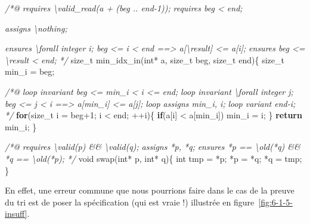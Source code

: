 \documentclass[12pt,francais,]{scrbook}
\newenvironment{Shaded}{}{}
\newcommand{\KeywordTok}[1]{\textcolor[rgb]{0.00,0.44,0.13}{\textbf{{#1}}}}
\newcommand{\DataTypeTok}[1]{\textcolor[rgb]{0.56,0.13,0.00}{{#1}}}
\newcommand{\DecValTok}[1]{\textcolor[rgb]{0.25,0.63,0.44}{{#1}}}
\newcommand{\CommentTok}[1]{\textcolor[rgb]{0.38,0.63,0.69}{\textit{{#1}}}}
\newcommand{\NormalTok}[1]{{#1}}
\newenvironment{zdssecretblock}[1]{%
  \tcolorbox[beamer,%
    noparskip,breakable,
    colback=LightGray,colframe=DarkGray,%
    colbacklower=LightGray,%
    title=#1]
}{\endtcolorbox}
\begin{document}
\begin{zdssecretblock}{Solution}
  \begin{footnotesize}
  \begin{footnotesize}\begin{Shaded}
\begin{Highlighting}[]
\CommentTok{/*@}
\CommentTok{  requires \textbackslash{}valid_read(a + (beg .. end-1));}
\CommentTok{  requires beg < end;}

\CommentTok{  assigns  \textbackslash{}nothing;}

\CommentTok{  ensures  \textbackslash{}forall integer i; beg <= i < end ==> a[\textbackslash{}result] <= a[i];}
\CommentTok{  ensures  beg <= \textbackslash{}result < end;}
\CommentTok{*/}
\NormalTok{size_t min_idx_in(}\DataTypeTok{int}\NormalTok{* a, size_t beg, size_t end)\{}
  \NormalTok{size_t min_i = beg;}

  \CommentTok{/*@}
\CommentTok{    loop invariant beg <= min_i < i <= end;}
\CommentTok{    loop invariant \textbackslash{}forall integer j; beg <= j < i ==> a[min_i] <= a[j];}
\CommentTok{    loop assigns min_i, i;}
\CommentTok{    loop variant end-i;}
\CommentTok{  */}
  \KeywordTok{for}\NormalTok{(size_t i = beg}\DecValTok{+1}\NormalTok{; i < end; ++i)\{}
    \KeywordTok{if}\NormalTok{(a[i] < a[min_i]) min_i = i;}
  \NormalTok{\}}
  \KeywordTok{return} \NormalTok{min_i;}
\NormalTok{\}}

\CommentTok{/*@}
\CommentTok{  requires \textbackslash{}valid(p) && \textbackslash{}valid(q);}
\CommentTok{  assigns  *p, *q;}
\CommentTok{  ensures  *p == \textbackslash{}old(*q) && *q == \textbackslash{}old(*p);}
\CommentTok{*/}
\DataTypeTok{void} \NormalTok{swap(}\DataTypeTok{int}\NormalTok{* p, }\DataTypeTok{int}\NormalTok{* q)\{}
  \DataTypeTok{int} \NormalTok{tmp = *p; *p = *q; *q = tmp;}
\NormalTok{\}}
\end{Highlighting}
  \end{Shaded}\end{footnotesize}
  \end{footnotesize}
\end{zdssecretblock}

En effet, une erreur commune que nous pourrions faire dans le cas de la
preuve du tri est de poser la spécification (qui est vraie !) illustrée
en figure~\ref{fig:6-1-5-insuff}.
\end{document}
